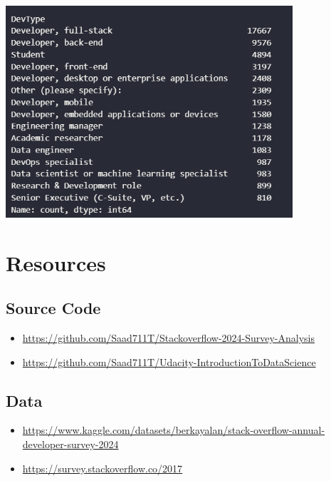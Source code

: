 \documentclass[12pt,a4paper]{article}
\begin{document}
\includegraphics[width=0.8\textwidth]{images/top10-2024jobs.png} \\

\section*{Resources}
\subsection*{Source Code}
\begin{itemize}
    \item \url{https://github.com/Saad711T/Stackoverflow-2024-Survey-Analysis}
    \item \url{https://github.com/Saad711T/Udacity-IntroductionToDataScience}
\end{itemize}

\subsection*{Data}
\begin{itemize}
    \item \url{https://www.kaggle.com/datasets/berkayalan/stack-overflow-annual-developer-survey-2024}
    \item \url{https://survey.stackoverflow.co/2017}
\end{itemize}
\end{document}
